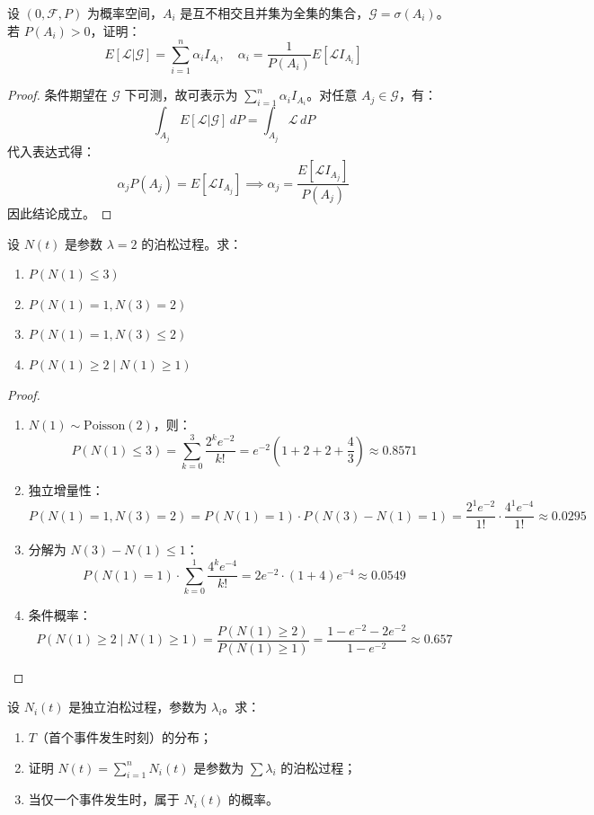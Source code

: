 \documentclass[lang=cn,10pt,thmcnt=section]{elegantbook}
\begin{document}
\begin{example}
	设 \( (0, \mathcal{F}, P) \) 为概率空间，\( A_i \) 是互不相交且并集为全集的集合，\( \mathcal{G} = \sigma(A_i) \)。若 \( P(A_i) > 0 \)，证明：
\[
E[\mathcal{L}|\mathcal{G}] = \sum_{i=1}^{n} \alpha_i I_{A_i}, \quad \alpha_i = \frac{1}{P(A_i)} E[\mathcal{L}I_{A_i}]
\]
\end{example}
\begin{proof}
	条件期望在 \( \mathcal{G} \) 下可测，故可表示为 \( \sum_{i=1}^{n} \alpha_i I_{A_i} \)。对任意 \( A_j \in \mathcal{G} \)，有：
\[
\int_{A_j} E[\mathcal{L}|\mathcal{G}] \, dP = \int_{A_j} \mathcal{L} \, dP
\]
代入表达式得：
\[
\alpha_j P(A_j) = E[\mathcal{L}I_{A_j}] \implies \alpha_j = \frac{E[\mathcal{L}I_{A_j}]}{P(A_j)}
\]
因此结论成立。
\end{proof}
\begin{example}
	设 \( N(t) \) 是参数 \( \lambda = 2 \) 的泊松过程。求：
\begin{enumerate}
    \item \( P(N(1) \leq 3) \)
    \item \( P(N(1) = 1, N(3) = 2) \)
    \item \( P(N(1) = 1, N(3) \leq 2) \)
    \item \( P(N(1) \geq 2 \mid N(1) \geq 1) \)
\end{enumerate}
\end{example}
\begin{proof}
	\begin{enumerate}
		\item \( N(1) \sim \text{Poisson}(2) \)，则：
		\[
		P(N(1) \leq 3) = \sum_{k=0}^{3} \frac{2^k e^{-2}}{k!} = e^{-2} \left(1 + 2 + 2 + \frac{4}{3}\right) \approx 0.8571
		\]
		\item 独立增量性：
		\[
		P(N(1)=1, N(3)=2) = P(N(1)=1) \cdot P(N(3)-N(1)=1) = \frac{2^1 e^{-2}}{1!} \cdot \frac{4^1 e^{-4}}{1!} \approx 0.0295
		\]
		\item 分解为 \( N(3)-N(1) \leq 1 \)：
		\[
		P(N(1)=1) \cdot \sum_{k=0}^{1} \frac{4^k e^{-4}}{k!} = 2e^{-2} \cdot (1 + 4)e^{-4} \approx 0.0549
		\]
		\item 条件概率：
		\[
		P(N(1) \geq 2 \mid N(1) \geq 1) = \frac{P(N(1) \geq 2)}{P(N(1) \geq 1)} = \frac{1 - e^{-2} - 2e^{-2}}{1 - e^{-2}} \approx 0.657
		\]
	\end{enumerate}
\end{proof}
\begin{example}
	设 \( N_i(t) \) 是独立泊松过程，参数为 \( \lambda_i \)。求：
\begin{enumerate}
    \item \( T \)（首个事件发生时刻）的分布；
    \item 证明 \( N(t) = \sum_{i=1}^{n} N_i(t) \) 是参数为 \( \sum \lambda_i \) 的泊松过程；
    \item 当仅一个事件发生时，属于 \( N_i(t) \) 的概率。
\end{enumerate}
\end{example}
\end{document}
